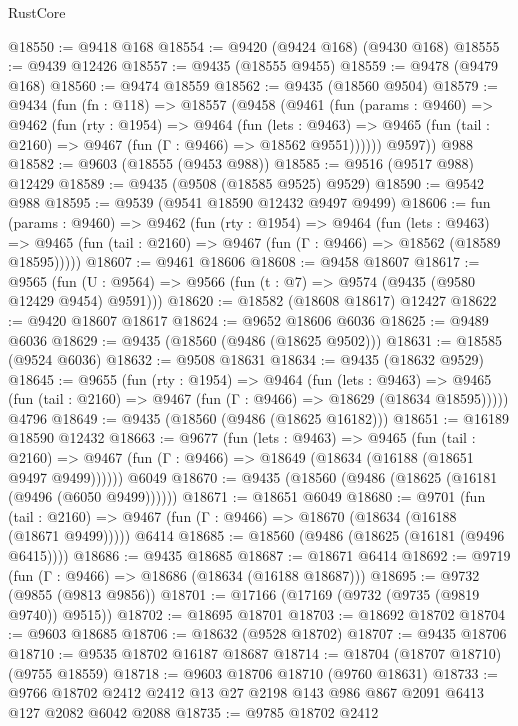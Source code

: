 \begin{lexlean}{RustCore}
\begin{coremodule}
@18550 := @9418 @168
@18554 := @9420 (@9424 @168) (@9430 @168)
@18555 := @9439 @12426
@18557 := @9435 (@18555 @9455)
@18559 := @9478 (@9479 @168)
@18560 := @9474 @18559
@18562 := @9435 (@18560 @9504)
@18579 := @9434
    (fun (fn : @118) =>
    @18557
      (@9458
        (@9461
          (fun (params : @9460) =>
          @9462
            (fun (rty : @1954) =>
            @9464
              (fun (lets : @9463) =>
              @9465 (fun (tail : @2160) => @9467 (fun (Γ : @9466) => @18562 @9551))))))
        @9597))
    @988
@18582 := @9603 (@18555 (@9453 @988))
@18585 := @9516 (@9517 @988) @12429
@18589 := @9435 (@9508 (@18585 @9525) @9529)
@18590 := @9542 @988
@18595 := @9539 (@9541 @18590 @12432 @9497 @9499)
@18606 := fun (params : @9460) =>
  @9462
    (fun (rty : @1954) =>
    @9464
      (fun (lets : @9463) =>
      @9465 (fun (tail : @2160) => @9467 (fun (Γ : @9466) => @18562 (@18589 @18595)))))
@18607 := @9461 @18606
@18608 := @9458 @18607
@18617 := @9565
    (fun (U : @9564) => @9566 (fun (t : @7) => @9574 (@9435 (@9580 @12429 @9454) @9591)))
@18620 := @18582 (@18608 @18617) @12427
@18622 := @9420 @18607 @18617
@18624 := @9652 @18606 @6036
@18625 := @9489 @6036
@18629 := @9435 (@18560 (@9486 (@18625 @9502)))
@18631 := @18585 (@9524 @6036)
@18632 := @9508 @18631
@18634 := @9435 (@18632 @9529)
@18645 := @9655
    (fun (rty : @1954) =>
    @9464
      (fun (lets : @9463) =>
      @9465 (fun (tail : @2160) => @9467 (fun (Γ : @9466) => @18629 (@18634 @18595)))))
    @4796
@18649 := @9435 (@18560 (@9486 (@18625 @16182)))
@18651 := @16189 @18590 @12432
@18663 := @9677
    (fun (lets : @9463) =>
    @9465
      (fun (tail : @2160) =>
      @9467 (fun (Γ : @9466) => @18649 (@18634 (@16188 (@18651 @9497 @9499))))))
    @6049
@18670 := @9435 (@18560 (@9486 (@18625 (@16181 (@9496 (@6050 @9499))))))
@18671 := @18651 @6049
@18680 := @9701
    (fun (tail : @2160) => @9467 (fun (Γ : @9466) => @18670 (@18634 (@16188 (@18671 @9499)))))
    @6414
@18685 := @18560 (@9486 (@18625 (@16181 (@9496 @6415))))
@18686 := @9435 @18685
@18687 := @18671 @6414
@18692 := @9719 (fun (Γ : @9466) => @18686 (@18634 (@16188 @18687)))
@18695 := @9732 (@9855 (@9813 @9856))
@18701 := @17166 (@17169 (@9732 (@9735 (@9819 @9740)) @9515))
@18702 := @18695 @18701
@18703 := @18692 @18702
@18704 := @9603 @18685
@18706 := @18632 (@9528 @18702)
@18707 := @9435 @18706
@18710 := @9535 @18702 @16187 @18687
@18714 := @18704 (@18707 @18710) (@9755 @18559)
@18718 := @9603 @18706 @18710 (@9760 @18631)
@18733 := @9766 @18702 @2412 @2412 @13 @27 @2198 @143 @986 @867 @2091 @6413 @127 @2082 @6042 @2088
@18735 := @9785 @18702 @2412

\end{coremodule}
\end{lexlean}
